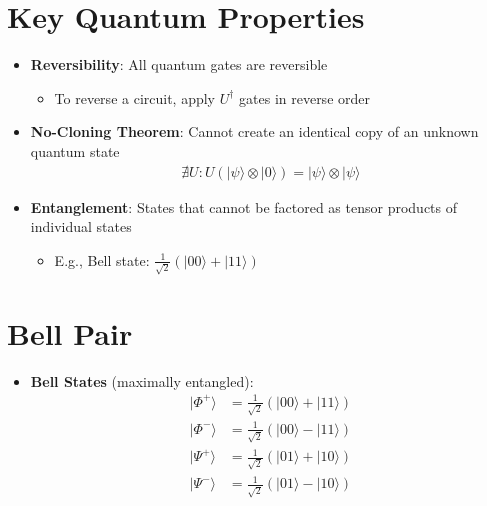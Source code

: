\begin{multicols}{3}
                  \section*{Key Quantum Properties}
                  \begin{itemize}[leftmargin=*,nosep,topsep=0pt]
                    \item \textbf{Reversibility}: All quantum gates are reversible
                      \begin{itemize}[nosep]
                        \item To reverse a circuit, apply $U^\dagger$ gates in reverse order
                      \end{itemize}

                    \item \textbf{No-Cloning Theorem}: Cannot create an identical copy of an
                      unknown quantum state
                      \begin{align*}
                        \nexists U: U(|\psi\rangle \otimes |0\rangle) = |\psi\rangle \otimes
                        |\psi\rangle
                      \end{align*}

                    \item \textbf{Entanglement}: States that cannot be factored as tensor
                      products of individual states
                      \begin{itemize}[nosep]
                        \item E.g., Bell state: $\frac{1}{\sqrt{2}}(|00\rangle + |11\rangle)$
                      \end{itemize}
                  \end{itemize}

                  \section*{Bell Pair}
                  \begin{itemize}[leftmargin=*,nosep,topsep=0pt]
                    \item \textbf{Bell States} (maximally entangled):
                      \begin{align*}
                        |\Phi^+\rangle &= \frac{1}{\sqrt{2}}(|00\rangle + |11\rangle)\\
                        |\Phi^-\rangle &= \frac{1}{\sqrt{2}}(|00\rangle - |11\rangle)\\
                        |\Psi^+\rangle &= \frac{1}{\sqrt{2}}(|01\rangle + |10\rangle)\\
                        |\Psi^-\rangle &= \frac{1}{\sqrt{2}}(|01\rangle - |10\rangle)
                      \end{align*}


\end{itemize}
\end{multicols}

